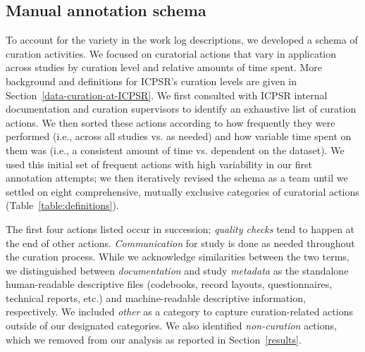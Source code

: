 \documentclass[conference]{IEEEtran}
\begin{document}
\subsection{Manual annotation schema}
\label{annotation-schema}
To account for the variety in the work log descriptions, we developed a schema of curation activities. We focused on curatorial actions that vary in application across studies by curation level and relative amounts of time spent. More background and definitions for ICPSR’s curation levels are given in Section~\ref{data-curation-at-ICPSR}. We first consulted with ICPSR internal documentation and curation supervisors to identify an exhaustive list of curation actions. We then sorted these actions according to how frequently they were performed (i.e., across all studies vs. as needed) and how variable time spent on them was (i.e., a consistent amount of time vs. dependent on the dataset). We used this initial set of frequent actions with high variability in our first annotation attempts; we then iteratively revised the schema as a team until we settled on eight comprehensive, mutually exclusive categories of curatorial actions (Table~\ref{table:definitions}). 

The first four actions listed occur in succession; \textit{quality checks} tend to happen at the end of other actions. \textit{Communication} for study is done as needed throughout the curation process. While we acknowledge similarities between the two terms, we distinguished between \textit{documentation} and study \textit{metadata} as the standalone human-readable descriptive files (codebooks, record layouts, questionnaires, technical reports, etc.) and machine-readable descriptive information, respectively. We included \textit{other} as a category to capture curation-related actions outside of our designated categories. We also identified \textit{non-curation} actions, which we removed from our analysis as reported in Section~\ref{results}.
\end{document}
